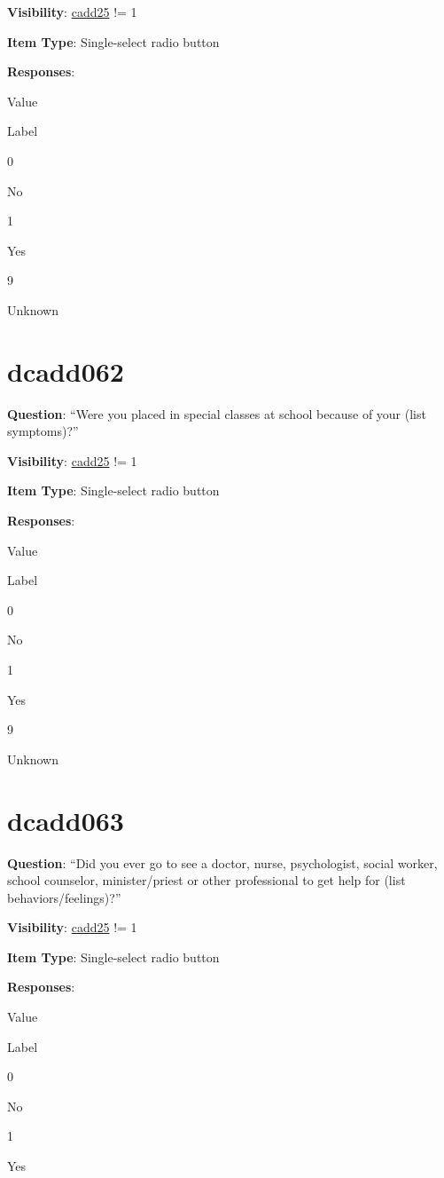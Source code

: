 \documentclass[]{book}
\begin{document}
\textbf{Visibility}: \protect\hyperlink{cadd25}{cadd25} != 1

\textbf{Item Type}: Single-select radio button

\textbf{Responses}:

Value

Label

0

No

1

Yes

9

Unknown

\hypertarget{dcadd062}{%
\section{dcadd062}\label{dcadd062}}

\textbf{Question}: ``Were you placed in special classes at school because of your (list symptoms)?''

\textbf{Visibility}: \protect\hyperlink{cadd25}{cadd25} != 1

\textbf{Item Type}: Single-select radio button

\textbf{Responses}:

Value

Label

0

No

1

Yes

9

Unknown

\hypertarget{dcadd063}{%
\section{dcadd063}\label{dcadd063}}

\textbf{Question}: ``Did you ever go to see a doctor, nurse, psychologist, social worker, school counselor, minister/priest or other professional to get help for (list behaviors/feelings)?''

\textbf{Visibility}: \protect\hyperlink{cadd25}{cadd25} != 1

\textbf{Item Type}: Single-select radio button

\textbf{Responses}:

Value

Label

0

No

1

Yes
\end{document}
